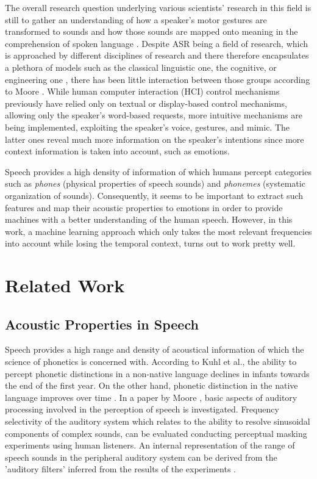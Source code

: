 \documentclass[11pt,a4paper,twoside]{article}
\theoremstyle{thmbreak}
\numberwithin{Theorem}{subsection}
\theoremstyle{defbreak}
\theoremstyle{remark}
\theoremstyle{remark}
\begin{document}
 
The overall research question underlying various scientists' research in this field  is still to gather an understanding of how  a speaker's motor gestures  are transformed to sounds and how those sounds are mapped onto meaning in the comprehension of spoken language \cite{moore2008introduction}.  
Despite ASR being a field of research, which is approached by different disciplines of research and there therefore encapsulates a plethora of models such as the classical linguistic one, the cognitive, or engineering one \cite{shafaei2018wide}, there has been little interaction between those groups according to Moore \cite{moore2008introduction}.
While human computer interaction (HCI) control  mechanisms previously have relied only on textual or display-based control mechanisms, allowing only the speaker's word-based requests,
more intuitive mechanisms are being implemented, exploiting the speaker's  voice, gestures, and mimic. 
The latter ones reveal much more information on the speaker's intentions since more context information is 
 taken into account, such as emotions.

 Speech provides a high density of information of which humans percept categories such as \textit{phones} (physical properties of speech sounds) and \textit{phonemes} (systematic organization of sounds). 
Consequently, it seems to be important to extract such features and map their acoustic properties to emotions in order to provide machines with a better understanding of the human speech.
However, in this work, a machine learning approach which only takes the most relevant frequencies into account while losing the temporal context, turns out to work pretty well.



\section{Related Work}

\subsection{Acoustic Properties in Speech}
Speech provides a high range and density of acoustical information of which the science of phonetics is concerned with. According to Kuhl et al., the ability to percept phonetic distinctions in a non-native language declines in infants towards the end of the first year. On the other hand, phonetic distinction in the native language improves over time \cite{kuhl2008phonetic}.
In a paper by Moore \cite{moore2008basic}, basic aspects of auditory processing involved in the perception of speech is investigated.
Frequency selectivity of the auditory system which relates to the ability to  resolve sinusoidal components of  complex sounds, can be evaluated conducting  perceptual masking experiments using human listeners. An internal representation of the range of speech sounds in the peripheral auditory system  can be derived from the 'auditory filters' inferred from the results of the experiments \cite{moore2008basic}.
\end{document}
